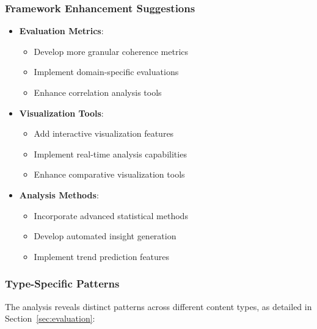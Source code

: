 \subsubsection{Framework Enhancement Suggestions}
\begin{itemize}
    \item \textbf{Evaluation Metrics}:
    \begin{itemize}
        \item Develop more granular coherence metrics
        \item Implement domain-specific evaluations
        \item Enhance correlation analysis tools
    \end{itemize}
    \item \textbf{Visualization Tools}:
    \begin{itemize}
        \item Add interactive visualization features
        \item Implement real-time analysis capabilities
        \item Enhance comparative visualization tools
    \end{itemize}
    \item \textbf{Analysis Methods}:
    \begin{itemize}
        \item Incorporate advanced statistical methods
        \item Develop automated insight generation
        \item Implement trend prediction features
    \end{itemize}
\end{itemize}

\subsubsection{Type-Specific Patterns}
The analysis reveals distinct patterns across different content types, as detailed in Section~\ref{sec:evaluation}:


